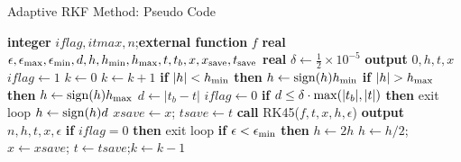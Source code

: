 \documentclass{beamer}
\begin{document}
\begin{frame}{Adaptive RKF Method: Pseudo Code}
\tiny
\begin{algorithmic}[]
\tiny
{}
\State \textbf{integer} $iflag, itmax, n$;\textbf{external function} $f$ 
\State \textbf{real} $\epsilon, \epsilon_{\rm max}, \epsilon_{\rm min}, d, h, h_{\rm min}, h_{\rm max}, t, t_b, x, x_{\rm save}, t_{\rm save}$
\State \textbf{real} $\delta \gets \frac{1}{2}\times 10^{-5}$
\State \textbf{output} $0, h, t, x$
\State $iflag \gets 1$
\State $k \gets 0$
\State  $k\gets k+1$ 
\State \textbf{if} $|h| < h_{\rm min}$ \textbf{then}  $h \gets {\rm sign}(h)h_{\rm min}$ 
\State \textbf{if} $|h| > h_{\rm max}$ \textbf{then} $ h \gets {\rm sign}(h)h_{\rm max}$
 \State $d \gets  |t_b- t|$ 
\State $iflag \gets 0$
 \State \textbf{if} $d\le \delta \cdot {\rm max}(|t_b|, |t|)$ \textbf{then} exit loop 
 \State $h \gets {\rm sign}(h)d$
\EndIf
\State  $xsave \gets x$; $tsave \gets t$ 
\State \textbf{call} RK45($ f, t, x, h, \epsilon$)
\State \textbf{output} $n,h,t,x,\epsilon$
\State \textbf{if} $iflag = 0$ \textbf{then} exit loop 
\State \textbf{if} $\epsilon<\epsilon_{\rm min}$ \textbf{then} $h \gets 2h$
\State $h \gets h/2$; $x \gets xsave$; $t \gets tsave$;$k\gets k-1$ 
\EndIf
\EndWhile 
\EndProcedure
\end{algorithmic}
\end{frame}
\end{document}
